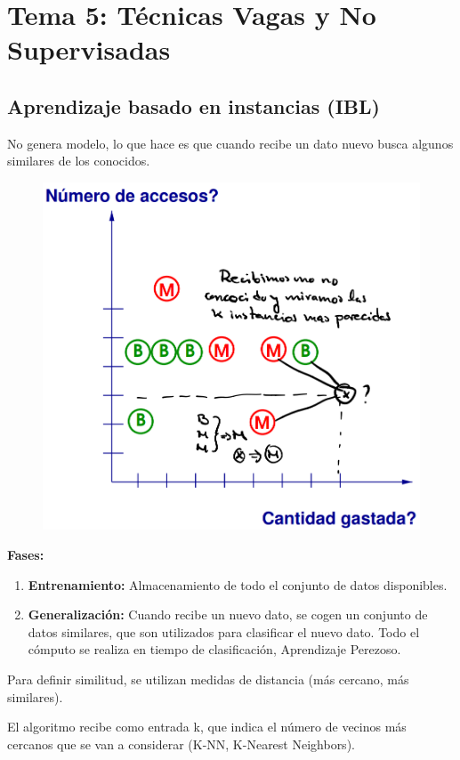 \documentclass[12pt, twoside, openright]{report} %
\begin{document}
\chapter{Tema 5: Técnicas Vagas y No Supervisadas}
\section{Aprendizaje basado en instancias (IBL)}
No genera modelo, lo que hace es que cuando recibe un dato nuevo busca algunos similares de los conocidos.
\begin{figure}[H]
	{\includegraphics[scale=.3]{2021-03-19 12_05_34-Aprendizaje basado en instancias y no supervisados.pdf - Foxit Reader.png}}
\end{figure}
\textbf{Fases:}
\begin{enumerate}
	\item \textbf{Entrenamiento:} Almacenamiento de todo el conjunto de datos disponibles.
	\item \textbf{Generalización:} Cuando recibe un nuevo dato, se cogen un conjunto de datos similares, que son utilizados para clasificar el nuevo dato. Todo el cómputo se realiza en tiempo de clasificación, Aprendizaje Perezoso.
\end{enumerate}
Para definir similitud, se utilizan medidas de distancia (más cercano, más similares).

El algoritmo recibe como entrada k, que indica el número de vecinos más cercanos que se van a considerar (K-NN, K-Nearest Neighbors).
\end{document}
